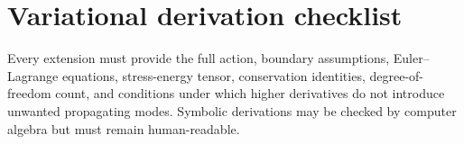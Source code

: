 \section{Variational derivation checklist}
\label{app:variation}

Every extension must provide the full action, boundary assumptions, Euler--Lagrange equations, stress-energy tensor, conservation identities, degree-of-freedom count, and conditions under which higher derivatives do not introduce unwanted propagating modes. Symbolic derivations may be checked by computer algebra but must remain human-readable.

